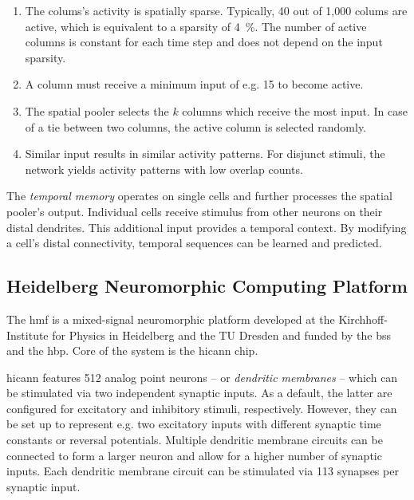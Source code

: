 \begin{enumerate}
	\item\label{enm:spatial_pooler_sparsity} The colums's activity is spatially sparse. Typically, 40 out of 1,000 colums are active, which is equivalent to a sparsity of \SI{4}{\%}. The number of active columns is constant for each time step and does not depend on the input sparsity.
	\item\label{enm:spatial_pooler_minimum} A column must receive a minimum input of e.g. 15 to become active.
	\item\label{enm:spatial_pooler_selection} The spatial pooler selects the $k$ columns which receive the most input. In case of a tie between two columns, the active column is selected randomly.
	\item\label{enm:spatial_pooler_overlap} Similar input results in similar activity patterns. For disjunct stimuli, the network yields activity patterns with low overlap counts.
\end{enumerate}


The \emph{temporal memory} operates on single cells and further processes the spatial pooler's output. Individual cells receive stimulus from other neurons on their distal dendrites. This additional input provides a temporal context. By modifying a cell's distal connectivity, temporal sequences can be learned and predicted.

\subsection{Heidelberg Neuromorphic Computing Platform}

The \gls{hmf} is a mixed-signal neuromorphic platform developed at the Kirchhoff-Institute for Physics in Heidelberg and the TU Dresden and funded by the \gls{bss} and the \gls{hbp}. Core of the system is the \gls{hicann} chip.

\gls{hicann} features 512 analog point neurons -- or \emph{dendritic membranes} -- which can be stimulated via two independent synaptic inputs. As a default, the latter are configured for excitatory and inhibitory stimuli, respectively. However, they can be set up to represent e.g. two excitatory inputs with different synaptic time constants or reversal potentials. Multiple dendritic membrane circuits can be connected to form a larger neuron and allow for a higher number of synaptic inputs. Each dendritic membrane circuit can be stimulated via 113 synapses per synaptic input.

